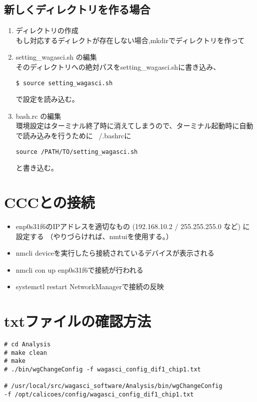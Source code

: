 \subsection{新しくディレクトリを作る場合}
\begin{enumerate}
\item ディレクトリの作成\\
もし対応するディレクトが存在しない場合,mkdirでディレクトリを作って

\item setting\_wagasci.sh の編集\\
そのディレクトリへの絶対パスをsetting\_wagasci.shに書き込み、
\begin{screen}
\begin{verbatim}
$ source setting_wagasci.sh
\end{verbatim}
\end{screen}
で設定を読み込む。
\item bash.rc の編集\\
環境設定はターミナル終了時に消えてしまうので、ターミナル起動時に自動で読み込みを行うために ~/.bashrcに
\begin{screen}
\begin{verbatim}
source /PATH/TO/setting_wagasci.sh
\end{verbatim}
\end{screen}
と書き込む。
\end{enumerate}

\newpage
\section{CCCとの接続}
\begin{itemize}
\item enp0s31f6のIPアドレスを適切なもの (192.168.10.2 / 255.255.255.0 など)  に設定する
（やりづらければ、nmtuiを使用する。）
\item nmcli deviceを実行したら接続されているデバイスが表示される
\item nmcli con up enp0s31f6で接続が行われる
\item systemctl restart NetworkManagerで接続の反映
\end{itemize}




\section{txtファイルの確認方法}

\begin{screen}
\begin{verbatim}
# cd Analysis
# make clean
# make
# ./bin/wgChangeConfig -f wagasci_config_dif1_chip1.txt

# /usr/local/src/wagasci_software/Analysis/bin/wgChangeConfig 
-f /opt/calicoes/config/wagasci_config_dif1_chip1.txt 
\end{verbatim}
\end{screen}




